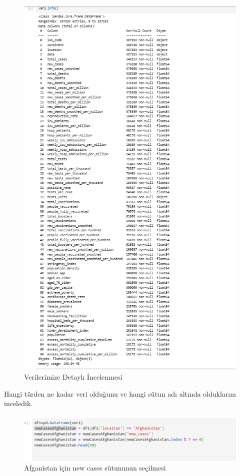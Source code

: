 \documentclass[12pt, a4paper]{article}
\begin{document}
\begin{figure}[!htbp] 
	
	\centering
	\includegraphics[angle=0, width=\textwidth]{2.png}
	\caption{Verilerimize Detaylı İncelenmesi}
\end{figure}
\newpage Hangi türden ne kadar veri olduğunu ve hangi sütun adı altında olduklarını inceledik. 
\begin{figure}[!htbp] 
	
	\centering
	\includegraphics[angle=0, width=\textwidth]{3.png}
	\caption{Afganistan için new cases sütununun seçilmesi}
\end{figure}
\end{document}
